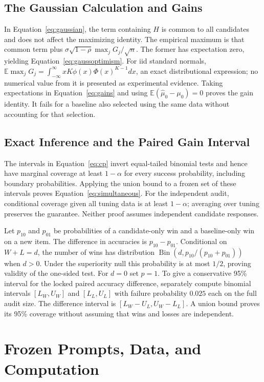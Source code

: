 \documentclass{article}
\newcommand{\E}{\mathbb{E}}
\newcommand{\muh}{\widehat\mu}
\begin{document}
\subsection{The Gaussian Calculation and Gains}
In Equation~\eqref{eq:gaussian}, the term containing $H$ is common to all candidates and does not affect the maximizing identity. The empirical maximum is that common term plus $\sigma\sqrt{1-\rho}\max_jG_j/\sqrt n$. The former has expectation zero, yielding Equation~\eqref{eq:gaussoptimism}. For iid standard normals, $\E\max_jG_j=\int_{-\infty}^{\infty}xK\phi(x)\Phi(x)^{K-1}dx$, an exact distributional expression; no numerical value from it is presented as experimental evidence. Taking expectations in Equation~\eqref{eq:gains} and using $\E(\muh_0-\mu_0)=0$ proves the gain identity. It fails for a baseline also selected using the same data without accounting for that selection.

\subsection{Exact Inference and the Paired Gain Interval}
The intervals in Equation~\eqref{eq:cp} invert equal-tailed binomial tests and hence have marginal coverage at least $1-\alpha$ for every success probability, including boundary probabilities. Applying the union bound to a frozen set of these intervals proves Equation~\eqref{eq:simultaneous}. For the independent audit, conditional coverage given all tuning data is at least $1-\alpha$; averaging over tuning preserves the guarantee. Neither proof assumes independent candidate responses.

Let $p_{10}$ and $p_{01}$ be probabilities of a candidate-only win and a baseline-only win on a new item. The difference in accuracies is $p_{10}-p_{01}$. Conditional on $W+L=d$, the number of wins has distribution $\operatorname{Bin}(d,p_{10}/(p_{10}+p_{01}))$ when $d>0$. Under the superiority null this probability is at most $1/2$, proving validity of the one-sided test. For $d=0$ set $p=1$. To give a conservative 95\% interval for the locked paired accuracy difference, separately compute binomial intervals $[L_W,U_W]$ and $[L_L,U_L]$ with failure probability $0.025$ each on the full audit size. The difference interval is $[L_W-U_L,U_W-L_L]$. A union bound proves its 95\% coverage without assuming that wins and losses are independent.

\section{Frozen Prompts, Data, and Computation}\label{app:implementation}
\end{document}
